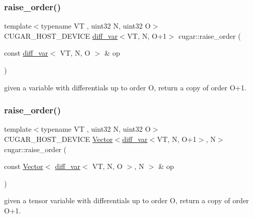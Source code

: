 \subsubsection{\texorpdfstring{raise\+\_\+order()}{raise\_order()}\hspace{0.1cm}{\footnotesize\ttfamily [2/5]}}
{\footnotesize\ttfamily template$<$typename VT , uint32 N, uint32 O$>$ \\
C\+U\+G\+A\+R\+\_\+\+H\+O\+S\+T\+\_\+\+D\+E\+V\+I\+CE \hyperlink{structcugar_1_1diff__var}{diff\+\_\+var}$<$VT, N, O+1$>$ cugar\+::raise\+\_\+order (\begin{DoxyParamCaption}\item[{const \hyperlink{structcugar_1_1diff__var}{diff\+\_\+var}$<$ VT, N, O $>$ \&}]{op }\end{DoxyParamCaption})\hspace{0.3cm}{\ttfamily [inline]}}

given a variable with differentials up to order O, return a copy of order O+1. \mbox{\label{group___auto_diff_module_ga5ffca09f2068cbef476ec0b01471b048}} 
\subsubsection{\texorpdfstring{raise\+\_\+order()}{raise\_order()}\hspace{0.1cm}{\footnotesize\ttfamily [3/5]}}
{\footnotesize\ttfamily template$<$typename VT , uint32 N, uint32 O$>$ \\
C\+U\+G\+A\+R\+\_\+\+H\+O\+S\+T\+\_\+\+D\+E\+V\+I\+CE \hyperlink{structcugar_1_1_vector}{Vector}$<$\hyperlink{structcugar_1_1diff__var}{diff\+\_\+var}$<$VT, N, O+1$>$, N$>$ cugar\+::raise\+\_\+order (\begin{DoxyParamCaption}\item[{const \hyperlink{structcugar_1_1_vector}{Vector}$<$ \hyperlink{structcugar_1_1diff__var}{diff\+\_\+var}$<$ VT, N, O $>$, N $>$ \&}]{op }\end{DoxyParamCaption})\hspace{0.3cm}{\ttfamily [inline]}}

given a tensor variable with differentials up to order O, return a copy of order O+1. \mbox{\label{group___auto_diff_module_ga927a53d59463095a4233941b69143e3d}} 
